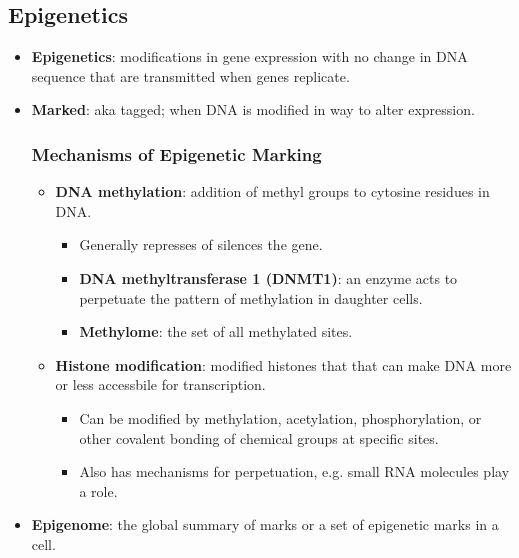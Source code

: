 \documentclass[12pt,a4paper]{article}
\begin{document}
\subsection{Epigenetics}
\begin{itemize}
    \item \textbf{Epigenetics}: modifications in gene expression with {\color{o-Sun}no change in DNA sequence} that are transmitted when genes replicate.
    \item \textbf{Marked}: aka tagged; when DNA is modified in way to alter expression.
        \subsubsection{Mechanisms of Epigenetic Marking}
        \begin{itemize}
            \item \textbf{DNA methylation}: addition of methyl groups to cytosine residues in DNA.
                \begin{itemize}
                    \item Generally represses of silences the gene.
                    \item \textbf{DNA methyltransferase 1 (DNMT1)}: an enzyme acts to perpetuate the pattern of methylation in daughter cells.
                    \item \textbf{Methylome}: the set of all methylated sites.
                \end{itemize}
            \item \textbf{Histone modification}: modified histones that that can make DNA more or less accessbile for transcription.
                \begin{itemize}
                    \item Can be modified by methylation, acetylation, phosphorylation, or other covalent bonding of chemical groups at specific sites.
                    \item Also has mechanisms for perpetuation, e.g. small RNA molecules play a role.
                \end{itemize}
        \end{itemize}
    \item \textbf{Epigenome}: the global summary of marks or a set of epigenetic marks in a cell.

\end{itemize}
\end{document}
